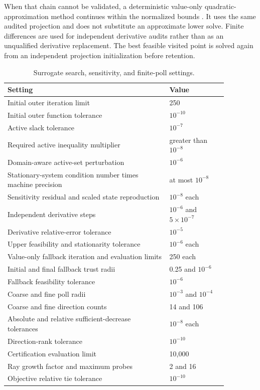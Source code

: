 When that chain cannot be validated, a deterministic value-only quadratic-approximation method continues within the normalized bounds \citep{Ragonneau2022}. It uses the same audited projection and does not substitute an approximate lower solve. Finite differences are used for independent derivative audits rather than as an unqualified derivative replacement. The best feasible visited point is solved again from an independent projection initialization before retention.

\begin{table}[htbp]
\centering\small
\caption{Surrogate search, sensitivity, and finite-poll settings.}\label{tab:plant_surrogate_search_settings}
\begin{tabular}{p{0.64\linewidth}p{0.23\linewidth}}
\toprule Setting & Value\\\midrule
Initial outer iteration limit & 250\\
Initial outer function tolerance & $10^{-10}$\\
Active slack tolerance & $10^{-7}$\\
Required active inequality multiplier & greater than $10^{-8}$\\
Domain-aware active-set perturbation & $10^{-6}$\\
Stationary-system condition number times machine precision & at most $10^{-8}$\\
Sensitivity residual and scaled state reproduction & $10^{-8}$ each\\
Independent derivative steps & $10^{-6}$ and $5\times10^{-7}$\\
Derivative relative-error tolerance & $10^{-5}$\\
Upper feasibility and stationarity tolerance & $10^{-6}$ each\\
Value-only fallback iteration and evaluation limits & 250 each\\
Initial and final fallback trust radii & 0.25 and $10^{-6}$\\
Fallback feasibility tolerance & $10^{-6}$\\
Coarse and fine poll radii & $10^{-3}$ and $10^{-4}$\\
Coarse and fine direction counts & 14 and 106\\
Absolute and relative sufficient-decrease tolerances & $10^{-8}$ each\\
Direction-rank tolerance & $10^{-10}$\\
Certification evaluation limit & 10{,}000\\
Ray growth factor and maximum probes & 2 and 16\\
Objective relative tie tolerance & $10^{-10}$\\
\bottomrule
\end{tabular}
\end{table}

